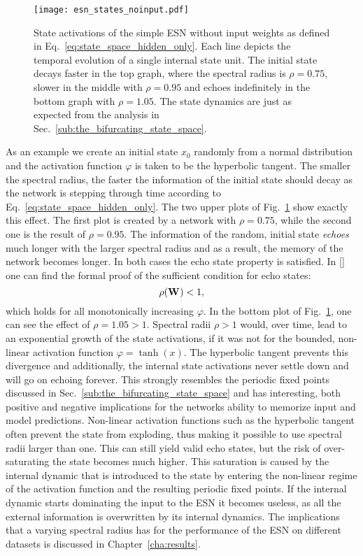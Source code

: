 \begin{figure}
  \centering
  \texttt{[image: esn\_states\_noinput.pdf]}
  \caption{State activations of the simple ESN without input weights as defined in
  Eq.~\ref{eq:state_space_hidden_only}. Each line depicts the temporal
  evolution of a single internal state unit. The initial state decays faster in
  the top graph, where the spectral radius is $\rho=0.75$, slower in the middle
  with $\rho=0.95$ and echoes indefinitely in the bottom graph with
  $\rho=1.05$.  The state dynamics are just as expected from the analysis in
  Sec.~\ref{sub:the_bifurcating_state_space}.
  }
  \label{fig:esn_states_noinput}
\end{figure}

As an example we create an initial state $x_0$ randomly from a normal
distribution and the activation function $\varphi$ is taken to be the
hyperbolic tangent.  The smaller the spectral radius, the faster the
information of the initial state should decay as the network is stepping
through time according to Eq.~\ref{eq:state_space_hidden_only}.  The two upper
plots of Fig.~\ref{fig:esn_states_noinput} show exactly this effect.  The first
plot is created by a network with $\rho=0.75$, while the second one is the
result of $\rho=0.95$. The information of the random, initial state
\emph{echoes} much longer with the larger spectral radius and as a result, the
memory of the network becomes longer.  In both cases the echo state property is
satisfied.  In [\cite{jaeger2001}] one can find the formal proof of the
sufficient condition for echo states:
\begin{equation}
  \rho(\boldsymbol{\textbf{W}}^{\text{}}) < 1,
\end{equation}
which holds for all monotonically increasing $\varphi$.  In the bottom plot of
Fig.~\ref{fig:esn_states_noinput}, one can see the effect of $\rho=1.05>1$.
Spectral radii $\rho > 1$ would, over time, lead to an exponential growth of
the state activations, if it was not for the bounded, non-linear activation
function $\varphi = \tanh(x)$.  The hyperbolic tangent prevents this divergence
and additionally, the internal state activations never settle down and will go
on echoing forever.  This strongly resembles the periodic fixed points
discussed in Sec.~\ref{sub:the_bifurcating_state_space} and has interesting,
both positive and negative implications for the networks ability to memorize
input and model predictions. Non-linear activation functions such as the
hyperbolic tangent often prevent the state from exploding, thus making it
possible to use spectral radii larger than one. This can still yield valid echo
states, but the risk of over-saturating the state becomes much higher.  This
saturation is caused by the internal dynamic that is introduced to the state by
entering the non-linear regime of the activation function and the resulting
periodic fixed points.  If the internal dynamic starts dominating the input to
the ESN it becomes useless, as all the external information is overwritten by
its internal dynamics.  The implications that a varying spectral radius has for
the performance of the ESN on different datasets is discussed in
Chapter~\ref{cha:results}.\\


